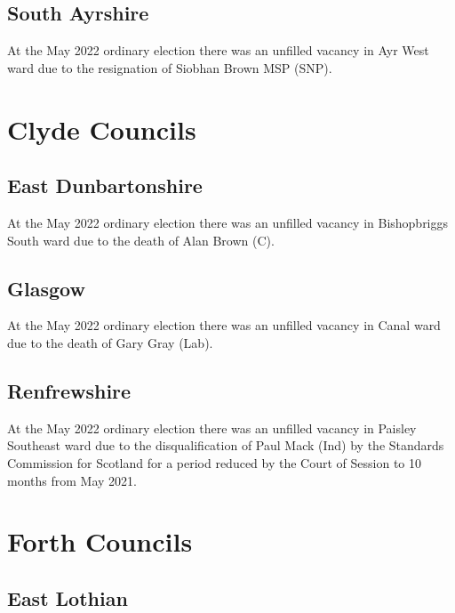 \documentclass[a4paper,openany]{book}
\begin{document}
\begin{resultsiii}
\subsection*{South Ayrshire}

At the May 2022 ordinary election there was an unfilled vacancy in Ayr West ward due to the resignation of Siobhan Brown MSP (SNP).%

\section{Clyde Councils}

\subsection*{East Dunbartonshire}

At the May 2022 ordinary election there was an unfilled vacancy in Bishopbriggs South ward due to the death of Alan Brown (C).%

\subsection*{Glasgow}

At the May 2022 ordinary election there was an unfilled vacancy in Canal ward due to the death of Gary Gray (Lab).%

\subsection*{Renfrewshire}

At the May 2022 ordinary election there was an unfilled vacancy in Paisley Southeast ward due to the disqualification of Paul Mack (Ind) by the Standards Commission for Scotland for a period reduced by the Court of Session to 10 months from May 2021.%

\section{Forth Councils}

\subsection*{East Lothian}


\end{resultsiii}
\end{document}
